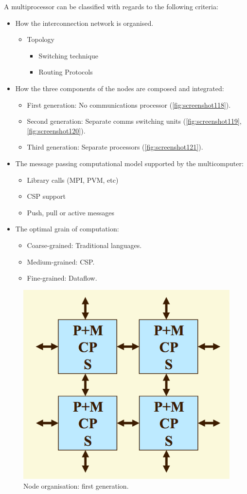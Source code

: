 A multiprocessor can be classified with regards to the following criteria: \begin{itemize}
\item How the interconnection network is organised. \begin{itemize}
	\item Topology \begin{itemize}
		\item Switching technique 
		\item Routing Protocols 
	\end{itemize}
\end{itemize}
\item How the three components of the nodes are composed and integrated: \begin{itemize}
	\item First generation: No communications processor (\autoref{fig:screenshot118}).
	\item Second generation: Separate comms switching units (\autoref{fig:screenshot119}, \autoref{fig:screenshot120}).
	\item Third generation: Separate processors (\autoref{fig:screenshot121}).
\end{itemize}
\item The message passing computational model supported by the multicomputer: \begin{itemize}
	\item Library calls (MPI, PVM, etc) 
	\item CSP support 
	\item Push, pull or active messages 
\end{itemize}
\item The optimal grain of computation: \begin{itemize}
	\item Coarse-grained: Traditional languages.
	\item Medium-grained: CSP.
	\item Fine-grained: Dataflow. 
\end{itemize}
\end{itemize}

\begin{figure}
\centering
\includegraphics[width=0.5\linewidth]{figures/screenshot118}
\caption{Node organisation: first generation.}
\label{fig:screenshot118}
\end{figure}

